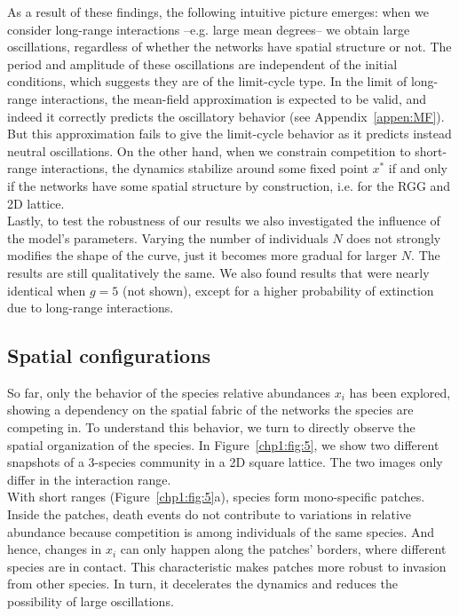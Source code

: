 As a result of these findings, the following intuitive picture emerges: when we consider long-range interactions --e.g. large mean degrees--  we obtain large oscillations, regardless of whether the networks have spatial structure or not. The period and  amplitude of these oscillations are independent of the initial conditions, which suggests they are of the limit-cycle type. In the limit of long-range interactions, the mean-field approximation is expected to be valid, and indeed it correctly predicts the oscillatory behavior (see Appendix~\ref{appen:MF}). But this approximation fails to give the limit-cycle behavior as it predicts instead neutral oscillations. On the other hand, when we constrain competition to short-range interactions, the dynamics stabilize around some fixed point $x^*$ if and only if the networks have some spatial structure by construction, i.e. for the RGG and 2D lattice. \\

Lastly, to test the robustness of our results we also investigated the influence of the model's parameters. Varying the number of individuals $N$ does not strongly modifies the shape of the curve, just it becomes more gradual for larger $N$. The results are still qualitatively the same. We also found results that were nearly identical when $g = 5$ (not shown), except for a higher probability of extinction due to long-range interactions.

\subsection{\label{chp1:2.3}Spatial configurations}

So far, only the behavior  of the species relative abundances $x_i$ has been explored, showing a dependency on the spatial fabric of the networks the species are competing in. To understand this behavior, we turn to directly observe the spatial organization of the species. In Figure~\ref{chp1:fig:5}, we show two different snapshots of a 3-species community in a 2D square lattice. The two images only differ in the interaction range. \\


With short ranges (Figure~\ref{chp1:fig:5}a), species form mono-specific patches. Inside the patches, death events  do not contribute to variations in relative abundance because competition is among individuals of the same species. And hence, changes in $x_i$ can only happen along the patches' borders, where different species are in contact. This characteristic makes patches more robust to invasion from other species. In turn, it decelerates the dynamics and reduces the possibility of large oscillations.  \\

